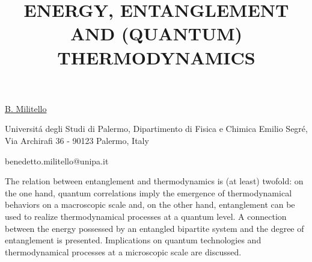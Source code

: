 \title{ENERGY, ENTANGLEMENT AND (QUANTUM) THERMODYNAMICS}

\underline{B. Militello}  

{\normalsize{\vspace{-4mm}
Universit\'{a} degli Studi di Palermo,
Dipartimento di Fisica e Chimica Emilio Segr\'{e},
Via Archirafi 36 - 90123 Palermo, Italy



\email benedetto.militello@unipa.it}}

The relation between entanglement and thermodynamics is (at least) twofold: on the one hand, quantum correlations imply the emergence of thermodynamical behaviors on a macroscopic scale and, on the other hand, entanglement can be used to realize thermodynamical processes at a quantum level. A connection between the energy possessed by an entangled bipartite system and the degree of entanglement is presented. Implications on quantum technologies and thermodynamical processes at a microscopic scale are discussed.

\vspace{\baselineskip}